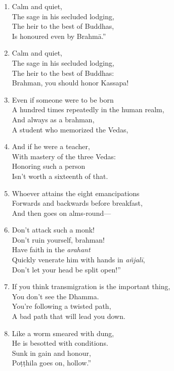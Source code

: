 \documentclass[10pt, openany]{book}
\newcommand*{\vleftofline}[1]{\leavevmode\llap{#1}}
\begin{document}
\begin{enumerate}
\item \vleftofline{“}Calm and quiet,\\
The sage in his secluded lodging,\\
The heir to the best of Buddhas,\\
Is honoured even by Brahmā.”

\item \vleftofline{“}Calm and quiet,\\
The sage in his secluded lodging,\\
The heir to the best of Buddhas:\\
Brahman, you should honor Kassapa!

\item Even if someone were to be born\\
A hundred times repeatedly in the human realm,\\
And always as a brahman,\\
A student who memorized the Vedas,

\item And if he were a teacher,\\
With mastery of the three Vedas:\\
Honoring such a person\\
Isn’t worth a sixteenth of that.

\item Whoever attains the eight emancipations\\
Forwards and backwards before breakfast,\\
And then goes on alms-round—

\item Don’t attack such a monk!\\
Don’t ruin yourself, brahman!\\
Have faith in the \emph{arahant}\\
Quickly venerate him with hands in \emph{añjalī},\\
Don’t let your head be split open!”

\item \vleftofline{“}If you think transmigration is the important thing,\\
You don’t see the Dhamma.\\
You’re following a twisted path,\\
A bad path that will lead you down.

\item Like a worm smeared with dung,\\
He is besotted with conditions.\\
Sunk in gain and honour,\\
Poṭṭhila goes on, hollow.”


\end{enumerate}
\end{document}

